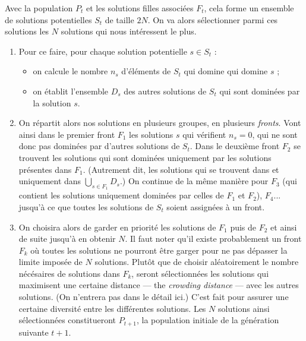  Avec la population $P_t$ et les solutions filles associées $F_t$, cela forme un ensemble de solutions potentielles $S_t$ de taille $2N$. 
 On va alors sélectionner parmi ces solutions les $N$ solutions qui nous intéressent le plus.
\begin{enumerate}[resume]
 \item Pour ce faire, pour chaque solution potentielle $s\in S_t$ :
 \begin{itemize}
  \item on calcule le nombre $n_s$ d'éléments de $S_t$ qui domine qui domine $s$ ;
  \item on établit l'ensemble $D_s$ des autres solutions de $S_t$ qui sont dominées par la solution $s$.
 \end{itemize}
 \item On répartit alors nos solutions en plusieurs groupes, en plusieurs \emph{fronts}.
 Vont ainsi dans le premier front $F_1$ les solutions $s$ qui vérifient $n_s = 0$, qui ne sont donc pas dominées par d'autres solutions de $S_t$. 
 Dans le deuxième front $F_2$ se trouvent les solutions qui sont dominées uniquement par les solutions présentes dans $F_1$.
 (Autrement dit, les solutions qui se trouvent dans et uniquement dans $\bigcup_{s\in F_1} D_s$.)
 On continue de la même manière pour $F_3$ (qui contient les solutions uniquement dominées par celles de $F_1$ et $F_2$), $F_4$... jusqu'à ce que toutes les solutions de $S_t$ soient assignées à un front.
 \item On choisira alors de garder en priorité les solutions de $F_1$ puis de $F_2$ et ainsi de suite jusqu'à en obtenir $N$. 
 Il faut noter qu'il existe probablement un front $F_k$ où toutes les solutions ne pourront être garger pour ne pas dépasser la limite imposée de $N$ solutions.
 Plutôt que de choisir aléatoirement le nombre nécésaires de solutions dans $F_k$, seront sélectionnées les solutions qui maximisent une certaine distance --- the \emph{crowding distance} --- avec les autres solutions.
 (On n'entrera pas dans le détail ici.)
 C'est fait pour assurer une certaine diversité entre les différentes solutions.
 Les $N$ solutions ainsi sélectionnées constitueront $P_{t+1}$, la population initiale de la génération suivante $t+1$.
\end{enumerate}

